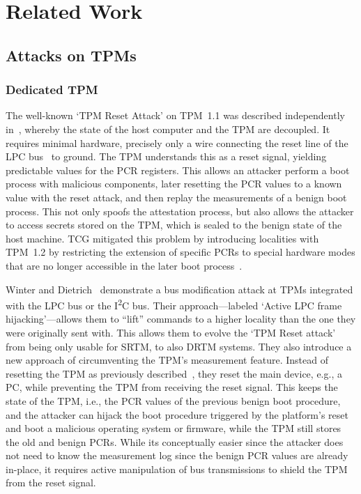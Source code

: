 
\chapter{Related Work}\label{chapter:related_work}

\section{Attacks on TPMs}

\subsection{Dedicated TPM}

The well-known `TPM Reset Attack' on TPM~1.1 was described independently in~\cite{kauerBernhard,sparks2007}, whereby the state of the host computer and the TPM are decoupled.
It requires minimal hardware, precisely only a wire connecting the reset line of the LPC bus~\cite{lpc} to ground.
The TPM understands this as a reset signal, yielding predictable values for the \ac{PCR} registers.
This allows an attacker perform a boot process with malicious components, later resetting the \ac{PCR} values to a known value with the reset attack, and then replay the measurements of a benign boot process.
This not only spoofs the attestation process, but also allows the attacker to access secrets stored on the TPM, which is sealed to the benign state of the host machine.
\Ac{TCG} mitigated this problem by introducing localities with TPM~1.2 by restricting the extension of specific \acp{PCR} to special hardware modes that are no longer accessible in the later boot process~\cite{tpmResetMitigation}.

Winter and Dietrich~\cite{Winter2013} demonstrate a bus modification attack at TPMs integrated with the LPC bus or the I\textsuperscript{2}C bus.
Their approach---labeled `Active LPC frame hijacking'---allows them to ``lift'' commands to a higher locality than the one they were originally sent with.
This allows them to evolve the `TPM Reset attack' from being only usable for \ac{SRTM}, to also \ac{DRTM} systems.
They also introduce a new approach of circumventing the TPM's measurement feature.
Instead of resetting the TPM as previously described~\cite{kauerBernhard,sparks2007}, they reset the main device, e.g., a PC, while preventing the TPM from receiving the reset signal.
This keeps the state of the TPM, i.e., the \ac{PCR} values of the previous benign boot procedure, and the attacker can hijack the boot procedure triggered by the platform's reset and boot a malicious operating system or firmware, while the TPM still stores the old and benign PCRs.
While its conceptually easier since the attacker does not need to know the measurement log since the benign \ac{PCR} values are already in-place, it requires active manipulation of bus transmissions to shield the TPM from the reset signal.

